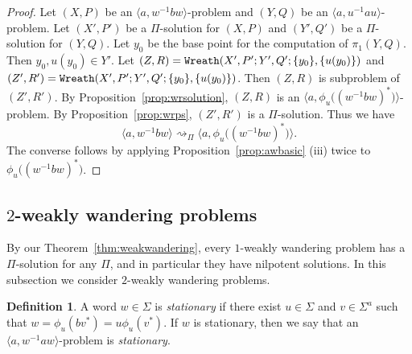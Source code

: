 \documentclass[11pt]{amsart}
\theoremstyle{definition}
\newtheorem{definition}[theorem]{Definition}
\theoremstyle{definition}
\numberwithin{equation}{section}
\begin{document}
\begin{proof} Let $(X, P)$ be an $\langle a, w^{-1}bw\rangle$-problem and $(Y, Q)$ be an $\langle a, u^{-1}au\rangle$-problem. Let $(X', P')$ be a $\Pi$-solution for $(X, P)$ and $(Y', Q')$ be a $\Pi$-solution for $(Y, Q)$. Let $y_0$ be the base point for the computation of $\pi_1(Y, Q)$. Then $y_0, u(y_0)\in Y'$. Let $(Z, R)=\mbox{\tt Wreath}(X', P'; Y', Q'; \{y_0\}, \{u(y_0)\})$ and $(Z', R')=\mbox{\tt Wreath}(X', P'; Y', Q'; \{y_0\}, \{u(y_0)\})$. Then $(Z, R)$ is subproblem of $(Z', R')$. By Proposition~\ref{prop:wrsolution}, $(Z, R)$ is an $\big\langle a, \phi_u\big((w^{-1}bw)^*\big)\big\rangle$-problem. By Proposition~\ref{prop:wrps}, $(Z', R')$ is a $\Pi$-solution. Thus we have
$$ \langle a, w^{-1}bw\rangle \rightsquigarrow_{\Pi} \big\langle a, \phi_u\big((w^{-1}bw)^*\big)\big\rangle.$$
The converse follows by applying Proposition~\ref{prop:awbasic} (iii) twice to $\phi_u\big((w^{-1}bw)^*\big)$.
\end{proof}










































\subsection{$2$-weakly wandering problems\label{subsec:2ww}}

By our Theorem~\ref{thm:weakwandering}, every $1$-weakly wandering problem has a $\Pi$-solution for any $\Pi$, and in particular they have nilpotent solutions. In this subsection we consider $2$-weakly wandering problems. 

\begin{definition} A word $w\in \Sigma$ is {\em stationary} if there exist $u\in \Sigma$ and $v\in \Sigma^a$ such that $w=\phi_u(bv^*)=u\phi_u(v^*)$. If $w$ is stationary, then we say that an $\langle a, w^{-1}aw\rangle$-problem is {\em stationary}.
\end{definition}
\end{document}
